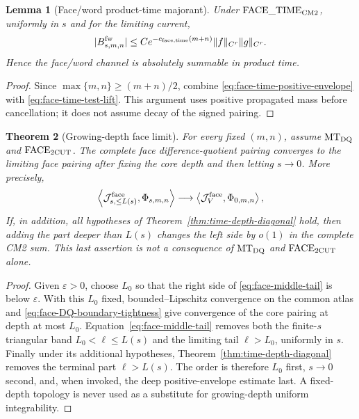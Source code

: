 \documentclass[11pt]{article}
\newtheorem{theorem}{Theorem}[section]
\newtheorem{lemma}[theorem]{Lemma}
\begin{document}
\begin{lemma}[Face/word product-time majorant]
\label{lem:face-time-majorant}
Under $\mathrm{FACE\_TIME}_{\rm CM2}$, uniformly in $s$ and for the limiting
current,
\begin{equation}
\label{eq:face-time-CM2-majorant}
 |B_{s,m,n}^{\rm fw}|
 \le C e^{-c_{\rm face,time}(m+n)}
 \|f\|_{C^r}\|g\|_{C^r}.
\end{equation}
Hence the face/word channel is absolutely summable in product time.
\end{lemma}

\begin{proof}
Since $\max\{m,n\}\ge(m+n)/2$, combine
\eqref{eq:face-time-positive-envelope} with
\eqref{eq:face-time-test-lift}.  This argument uses positive propagated
mass before cancellation; it does not assume decay of the signed pairing.
\end{proof}

\begin{theorem}[Growing-depth face limit]
\label{thm:face-two-cutoff}
For every fixed $(m,n)$, assume $\mathrm{MT}_{\rm DQ}$ and
$\mathrm{FACE}_{\rm 2CUT}$.  The complete face difference-quotient pairing
converges to the limiting face pairing after fixing the core depth and then
letting $s\to0$.  More precisely,
\begin{equation}
\label{eq:face-growing-depth-convergence}
 \left\langle\mathcal J_{s,\le L(s)}^{\rm face},
       \Phi_{s,m,n}\right\rangle
 \longrightarrow
\left\langle\mathcal J_{V}^{\rm face},
       \Phi_{0,m,n}\right\rangle,
\end{equation}
If, in addition, all hypotheses of
Theorem~\ref{thm:time-depth-diagonal} hold, then adding the part deeper than
$L(s)$ changes the left side by $o(1)$ in the complete CM2 sum.  This last
assertion is not a consequence of $\mathrm{MT}_{\rm DQ}$ and
$\mathrm{FACE}_{\rm 2CUT}$ alone.
\end{theorem}

\begin{proof}
Given $\varepsilon>0$, choose $L_0$ so that the right side of
\eqref{eq:face-middle-tail} is below $\varepsilon$.  With this $L_0$ fixed,
bounded--Lipschitz convergence on the common atlas and
\eqref{eq:face-DQ-boundary-tightness} give convergence of the core pairing
at depth at most $L_0$.  Equation~\eqref{eq:face-middle-tail} removes both
the finite-$s$ triangular band $L_0<\ell\le L(s)$ and the limiting tail
$\ell>L_0$, uniformly in $s$.  Finally
under its additional hypotheses,
Theorem~\ref{thm:time-depth-diagonal} removes the terminal part
$\ell>L(s)$.  The order is therefore $L_0$ first, $s\to0$ second, and,
when invoked, the deep positive-envelope estimate last.  A fixed-depth topology is never used
as a substitute for growing-depth uniform integrability.
\end{proof}
\end{document}
